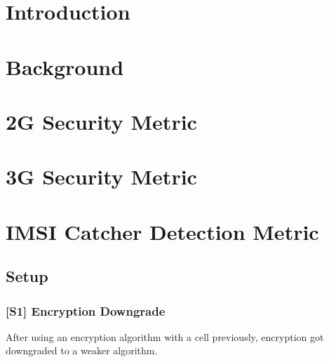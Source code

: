 \documentclass[a4paper,11pt,notitlepage,bigheadings,oneside]{scrartcl}
\begin{document}
\newcommand{\TBD}{{\color{srldark}\textbf{TBD}}}
\newcommand{\FIXME}[1]{{\color{srldark}\textit{FIXME: #1}\par}}

\maketitle
\pagebreak

\tableofcontents
\pagebreak

\section{Introduction}
\label{sec:introduction}

\section{Background}
\label{sec:background}



\section{2G Security Metric}
\label{sec:2g_security_metric}

\section{3G Security Metric}
\label{sec:3g_security_metric}

\section{IMSI Catcher Detection Metric}
\label{sec:imsi_catcher_detection_metric}

\subsection{Setup}

\subsubsection{[S1] Encryption Downgrade}

After using an encryption algorithm with a cell previously, encryption got
downgraded to a weaker algorithm.
\end{document}
